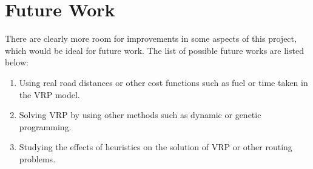 \section{Future Work}
There are clearly more room for improvements in some aspects of this project, which would be ideal for future work.
The list of possible future works are listed below:
\begin{enumerate}
    \item Using real road distances or other cost functions such as fuel or time taken in the VRP model.
    \item Solving VRP by using other methods such as dynamic or genetic programming.
    \item Studying the effects of heuristics on the solution of VRP or other routing problems.
\end{enumerate}
